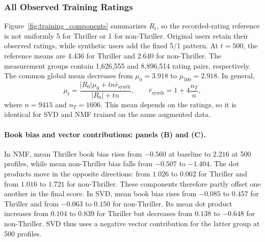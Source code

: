 \subsubsection{All Observed Training Ratings}

Figure~\ref{fig:training_components} summarizes $R_t$, so the recorded-rating reference is not uniformly 5 for Thriller or 1 for non-Thriller. Original users retain their observed ratings, while synthetic users add the fixed 5/1 pattern. At $t=500$, the reference means are 4.436 for Thriller and 2.640 for non-Thriller. The measurement groups contain 1,626,555 and 8,896,514 rating pairs, respectively. The common global mean decreases from $\mu_0=3.918$ to $\mu_{500}=2.918$. In general,
\begin{equation}
\label{eq:training_augmented_mean}
\mu_t=\frac{|R_0|\mu_0+tn\bar r_{\mathrm{synth}}}{|R_0|+tn},
\qquad
\bar r_{\mathrm{synth}}=1+4\frac{n_T}{n},
\end{equation}
where $n=9415$ and $n_T=1606$. This mean depends on the ratings, so it is identical for SVD and NMF trained on the same augmented data.

\paragraph{Book bias and vector contributions: panels (B) and (C).}
In NMF, mean Thriller book bias rises from $-0.560$ at baseline to $2.216$ at 500 profiles, while mean non-Thriller bias falls from $-0.507$ to $-1.404$. The dot products move in the opposite directions: from $1.026$ to $0.062$ for Thriller and from $1.016$ to $1.721$ for non-Thriller. These components therefore partly offset one another in the final score. In SVD, mean book bias rises from $-0.085$ to $0.457$ for Thriller and from $-0.063$ to $0.150$ for non-Thriller. Its mean dot product increases from $0.104$ to $0.839$ for Thriller but decreases from $0.138$ to $-0.648$ for non-Thriller. SVD thus uses a negative vector contribution for the latter group at 500 profiles.

